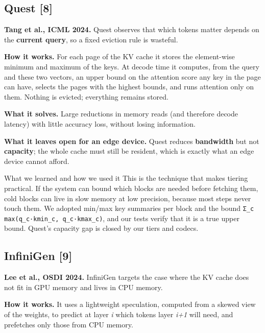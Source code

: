 \documentclass[12pt,a4paper]{report}
\begin{document}
\subsection{Quest [8]}
\textbf{Tang et al., ICML 2024.} Quest observes that which tokens matter depends on the \textbf{current query}, so a fixed eviction rule is wasteful.

\textbf{How it works.} For each page of the KV cache it stores the element-wise minimum and maximum of the keys. At decode time it computes, from the query and these two vectors, an upper bound on the attention score any key in the page can have, selects the pages with the highest bounds, and runs attention only on them. Nothing is evicted; everything remains stored.

\textbf{What it solves.} Large reductions in memory reads (and therefore decode latency) with little accuracy loss, without losing information.

\textbf{What it leaves open for an edge device.} Quest reduces \textbf{bandwidth} but not \textbf{capacity}; the whole cache must still be resident, which is exactly what an edge device cannot afford.

\begin{calloutbox}{What we learned and how we used it}
This is the technique that makes tiering practical. If the system can bound which blocks are needed before fetching them, cold blocks can live in slow memory at low precision, because most steps never touch them. We adopted min/max key summaries per block and the bound \texttt{Σ\_\allowbreak{}\allowbreak{}c max(q\_\allowbreak{}\allowbreak{}c·kmin\_\allowbreak{}\allowbreak{}c, q\_\allowbreak{}\allowbreak{}c·kmax\_\allowbreak{}\allowbreak{}c)}, and our tests verify that it is a true upper bound. Quest's capacity gap is closed by our tiers and codecs.

\end{calloutbox}
\subsection{InfiniGen [9]}
\textbf{Lee et al., OSDI 2024.} InfiniGen targets the case where the KV cache does not fit in GPU memory and lives in CPU memory.

\textbf{How it works.} It uses a lightweight speculation, computed from a skewed view of the weights, to predict at layer \textit{i} which tokens layer \textit{i+1} will need, and prefetches only those from CPU memory.
\end{document}
